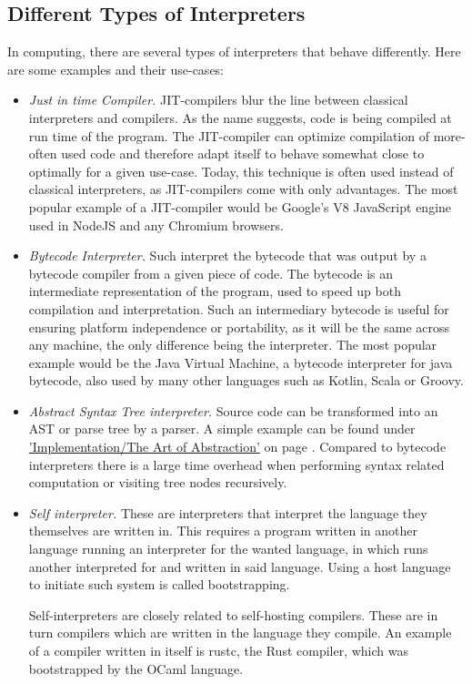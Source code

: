 \documentclass[12pt,a4paper]{article}
\begin{document}
\subsection{Different Types of Interpreters}
In computing, there are several types of interpreters that behave differently.
Here are some examples and their use-cases:
\begin{itemize}
    \item \emph{Just in time Compiler.} JIT-compilers blur the line between
        classical interpreters and compilers. As the name suggests, code is
        being compiled at run time of the program. The JIT-compiler can optimize
        compilation of more-often used code and therefore adapt itself to
        behave somewhat close to optimally for a given use-case. Today, this 
        technique is often used instead of classical interpreters, as
        JIT-compilers come with only advantages. The most popular example of
        a JIT-compiler would be Google's V8 JavaScript engine used
        in NodeJS and any Chromium browsers.
    \item \emph{Bytecode Interpreter.} Such interpret the bytecode that was
        output by a bytecode compiler from a given piece of code. The bytecode
        is an intermediate representation of the program, used to speed up
        both compilation and interpretation. Such an intermediary bytecode is
        useful for ensuring platform independence or portability, as it will be
        the same across any machine, the only difference being the interpreter.
        The most popular example would be the Java Virtual Machine,
        a bytecode interpreter for java bytecode, also used by many other languages
        such as Kotlin, Scala or Groovy.
    \item \emph{Abstract Syntax Tree interpreter.} Source code can be
        transformed into an AST or parse tree by a parser. A simple example
        can be found under 
        \hyperref[simple interpreter]{'Implementation/The Art of Abstraction'}
        on page \pageref{simple interpreter}. Compared to bytecode interpreters
        there is a large time overhead when performing syntax related computation
        or visiting tree nodes recursively.
    \item \emph{Self interpreter.} These are interpreters that interpret the
        language they themselves are written in. This requires a program
        written in another language running an interpreter for the wanted
        language, in which runs another interpreted for and written in said
        language. Using a host language to initiate such system is called
        bootstrapping.

        Self-interpreters are closely related to self-hosting compilers. These
        are in turn compilers which are written in the language they compile.
        An example of a compiler written in itself is rustc, the Rust
        compiler, which was bootstrapped by the OCaml language.
\end{itemize}
\end{document}
